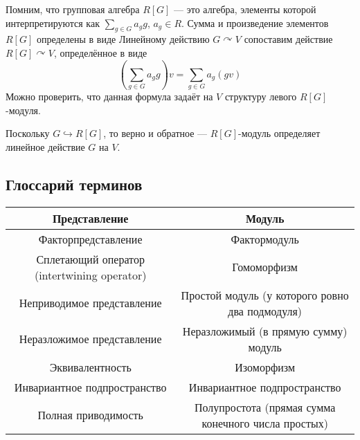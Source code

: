 Помним, что групповая алгебра $R[G]$ --- это алгебра, элементы которой интерпретируются как $\sum\limits_{g \in G}a_g g$, $a_g \in R$.
Сумма и произведение элементов $R[G]$ определены в виде
Линейному действию $G \curvearrowright V$ сопоставим действие $R[G] \curvearrowright V$, определённое в виде
\[\left(\sum\limits_{g \in G}a_g g\right) v = \sum\limits_{g \in G}a_g (gv)\]
Можно проверить, что данная формула задаёт на $V$ структуру левого $R[G]$-модуля.

Поскольку $G \hookrightarrow R[G]$, то верно и обратное --- $R[G]$-модуль определяет линейное действие $G$ на $V$.

\subsection{Глоссарий терминов}
\begin{tabular}{|c|c|}
    \hline
    Представление                               & Модуль                                              \\\hline
    Факторпредставление                         & Фактормодуль                                        \\\hline
    Сплетающий оператор (intertwining operator) & Гомоморфизм                                         \\\hline
    Неприводимое представление                  & Простой модуль (у которого ровно два подмодуля)     \\\hline
    Неразложимое представление                  & Неразложимый (в прямую сумму) модуль                \\\hline
    Эквивалентность                             & Изоморфизм                                          \\\hline
    Инвариантное подпространство                & Инвариантное подпространство                        \\\hline
    Полная приводимость                         & Полупростота (прямая сумма конечного числа простых) \\\hline
\end{tabular}

